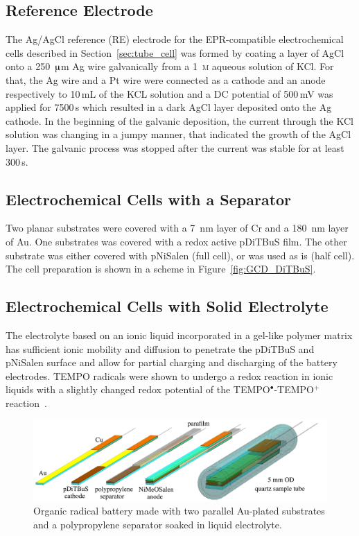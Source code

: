 \subsection{Reference Electrode}
\label{sec:re_prep}
The Ag/AgCl reference (RE) electrode for the EPR-compatible electrochemical cells described in Section~\ref{sec:tube_cell} was formed by coating a layer of AgCl onto a 250~$\muup$m Ag wire galvanically from a 1~\textsc{m} aqueous solution of KCl. For that, the Ag wire and a Pt wire were connected as a cathode and an anode respectively to 10$\,$mL of the KCL solution and a DC potential of 500$\,$mV was applied for 7500$\,$s which resulted in a dark AgCl layer deposited onto the Ag cathode. In the beginning of the galvanic deposition, the current through the KCl solution was changing in a jumpy manner, that indicated the growth of the AgCl layer. The galvanic process was stopped after the current was stable for at least 300$\,$s.\\

\subsection{Electrochemical Cells with a Separator}
Two planar substrates were covered with a 7~nm layer of Cr and a 180~nm layer of Au. One substrates was covered with a redox active pDiTBuS film. The other substrate was either covered with pNiSalen (full cell), or was used as is (half cell). The cell preparation is shown in a scheme in Figure~\ref{fig:GCD_DiTBuS}.

\subsection{Electrochemical Cells with Solid Electrolyte}
The electrolyte based on an ionic liquid incorporated in a gel-like polymer matrix has sufficient ionic mobility and diffusion to penetrate the pDiTBuS and pNiSalen surface and allow for partial charging and discharging of the battery electrodes. TEMPO radicals were shown to undergo a redox reaction in ionic liquids with a slightly changed redox potential of the TEMPO$^{\bullet}$-TEMPO$^+$ reaction~\cite{Golovisnina2023}.

\begin{figure}[h]
\center
	\includegraphics[width=1\textwidth]{./operando_epr/figures/sandwich/sandwich.pdf}
	\caption{Organic radical battery made with two parallel Au-plated substrates and a polypropylene separator soaked in liquid electrolyte.}
	\label{fig:sandwich_assembly}
\end{figure}



